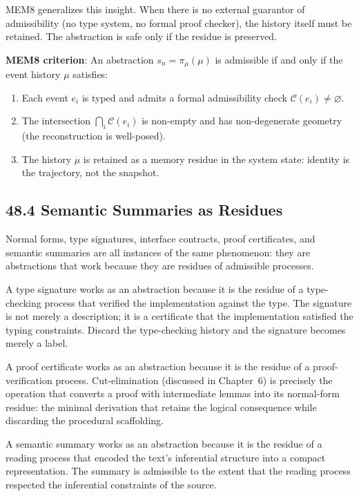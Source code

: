 \documentclass[12pt,letterpaper]{article}
\theoremstyle{remark}
\begin{document}
MEM\textbar{}8 generalizes this insight. When there is no external
guarantor of admissibility (no type system, no formal proof
checker), the history itself must be retained. The abstraction
is safe only if the residue is preserved.

\begin{notebox}
\textbf{MEM\textbar{}8 criterion}: An abstraction $s_n = \pi_\mu(\mu)$
is admissible if and only if the event history $\mu$ satisfies:
\begin{enumerate}
\item Each event $e_i$ is typed and admits a formal admissibility
  check $\mathcal{C}(e_i) \neq \varnothing$.
\item The intersection $\bigcap_i \mathcal{C}(e_i)$ is non-empty
  and has non-degenerate geometry (the reconstruction is
  well-posed).
\item The history $\mu$ is retained as a memory residue in the
  system state: identity is the trajectory, not the snapshot.
\end{enumerate}
\end{notebox}

\subsection{48.4 Semantic Summaries as Residues}

Normal forms, type signatures, interface contracts, proof
certificates, and semantic summaries are all instances of the
same phenomenon: they are abstractions that work because they are
residues of admissible processes.

A type signature works as an abstraction because it is the residue
of a type-checking process that verified the implementation against
the type. The signature is not merely a description; it is a
certificate that the implementation satisfied the typing constraints.
Discard the type-checking history and the signature becomes merely
a label.

A proof certificate works as an abstraction because it is the
residue of a proof-verification process. Cut-elimination (discussed
in Chapter~6) is precisely the operation that converts a proof with
intermediate lemmas into its normal-form residue: the minimal
derivation that retains the logical consequence while discarding
the procedural scaffolding.

A semantic summary works as an abstraction because it is the
residue of a reading process that encoded the text's inferential
structure into a compact representation. The summary is admissible
to the extent that the reading process respected the inferential
constraints of the source.
\end{document}
